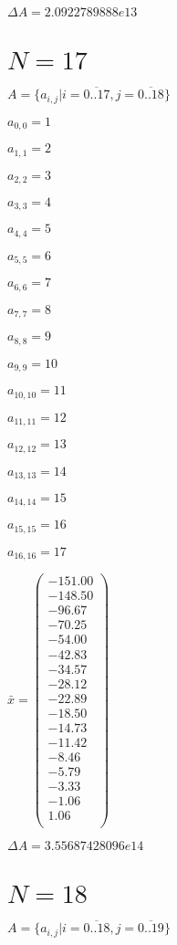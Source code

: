 \documentclass[a4paper,12pt]{article}
\begin{document}
$\Delta A = 2.0922789888e13$



\section{ $N = 17$ }
$A = \{ a _{ i, j } | i = \overline { 0..17 }, j = \overline { 0..18 } \}$

$a _{ 0, 0 } = 1$

$a _{ 1, 1 } = 2$

$a _{ 2, 2 } = 3$

$a _{ 3, 3 } = 4$

$a _{ 4, 4 } = 5$

$a _{ 5, 5 } = 6$

$a _{ 6, 6 } = 7$

$a _{ 7, 7 } = 8$

$a _{ 8, 8 } = 9$

$a _{ 9, 9 } = 10$

$a _{ 10, 10 } = 11$

$a _{ 11, 11 } = 12$

$a _{ 12, 12 } = 13$

$a _{ 13, 13 } = 14$

$a _{ 14, 14 } = 15$

$a _{ 15, 15 } = 16$

$a _{ 16, 16 } = 17$

$\bar { x } = \begin{pmatrix}
-151.00 \\
-148.50 \\
-96.67 \\
-70.25 \\
-54.00 \\
-42.83 \\
-34.57 \\
-28.12 \\
-22.89 \\
-18.50 \\
-14.73 \\
-11.42 \\
-8.46 \\
-5.79 \\
-3.33 \\
-1.06 \\
1.06 \\
\end{pmatrix}
$

$\Delta A = 3.55687428096e14$



\section{ $N = 18$ }
$A = \{ a _{ i, j } | i = \overline { 0..18 }, j = \overline { 0..19 } \}$
\end{document}
